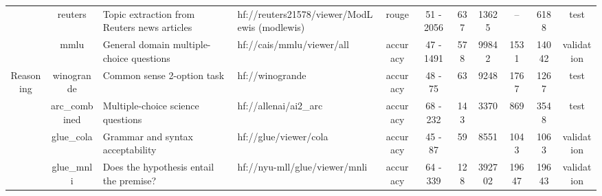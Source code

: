 \begin{landscape}
\begin{table}[ht]
{\begin{tabular}{ccllccccccc}
                                   & reuters                             & Topic extraction from Reuters news articles                           & hf://reuters21578/viewer/ModLewis (modlewis)                 & rouge                            & 51 - 2056                                 & 637                                     & 13625          & --                  & 6188          & test                                                                    \\
                                   & mmlu                                & General domain multiple-choice questions                              & hf://cais/mmlu/viewer/all                                    & accuracy                         & 47 - 1491                                 & 578                                     & 99842          & 1531                & 14042         & validation                                                              \\
\midrule
\multirow{13}{*}{Reasoning}        & winogrande                          & Common sense 2-option task                                            & hf://winogrande                                              & accuracy                         & 48 - 75                                   & 63                                      & 9248           & 1767                & 1267          & test                                                                    \\
                                   & arc\_combined                       & Multiple-choice science questions                                     & hf://allenai/ai2\_arc                                        & accuracy                         & 68 - 232                                  & 143                                     & 3370           & 869                 & 3548          & test                                                                    \\
                                   & glue\_cola                          & Grammar and syntax acceptability                                      & hf://glue/viewer/cola                                        & accuracy                         & 45 - 87                                   & 59                                      & 8551           & 1043                & 1063          & validation                                                              \\
                                   & glue\_mnli                          & Does the hypothesis entail the premise?                               & hf://nyu-mll/glue/viewer/mnli                                & accuracy                         & 64 - 339                                  & 128                                     & 392702         & 19647               & 19643         & validation                                                              \\

\end{tabular}}
\end{table}
\end{landscape}
